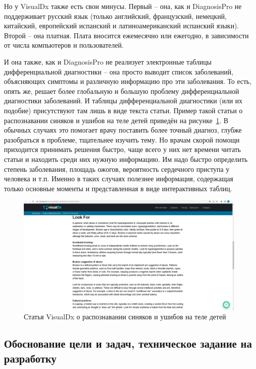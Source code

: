 Но у VisualDx также есть свои минусы. Первый -- она, как и  DiagnosisPro не поддерживает русский язык (только английский, французский, немецкий, китайский, европейский испанский и латиноамериканский испанский языки). Второй -- она платная. Плата вносится ежемесячно или ежегодно, в зависимости от числа компьютеров и пользователей.

И она также, как и DiagnosisPro не реализует электронные таблицы дифференциальной диагностики -- она просто выводит список заболеваний, объясняющих симптомы и различную информацию про эти заболевания. То есть, опять же, решает более глобальную и большую проблему дифференциальной диагностики заболеваний. И таблицы дифференциальной диагностики (или их подобие) присутствуют там лишь в виде текста статьи. Пример такой статьи о распознавании синяков и ушибов на теле детей приведён на рисунке~\ref{fig:vdx_ex_ac}. В обычных случаях это помогает врачу поставить более точный диагноз, глубже разобраться в проблеме, тщательнее изучить тему. Но врачам скорой помощи приходится принимать решения быстро, чаще всего у них нет времени читать статьи и находить среди них нужную информацию. Им надо быстро определить степень заболевания, площадь ожогов, вероятность сердечного приступа у человека и т.п. Именно в таких случаях полезнее информация, содержащая только основные моменты и представленная в виде интерактивных таблиц.
 
\begin{figure}
  \includegraphics[scale=0.3]{src/vdx_ex_article.png}
  \caption{Статья VisualDx о распознавании синяков и ушибов на теле детей}
  \label{fig:vdx_ex_ac}
\end{figure}

\subsection{Обоснование цели и задач, техническое задание на разработку}


